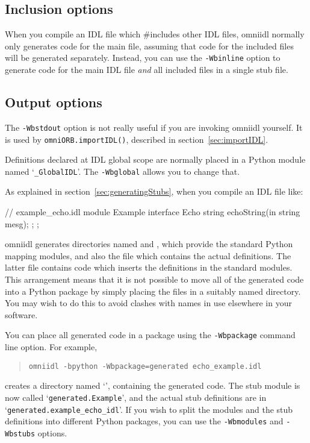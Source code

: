 \documentclass[11pt,oneside,a4paper]{book}
\newcommand{\module}[1]{\texttt{#1}}
\newcommand{\op}[1]{\texttt{#1()}}
\newcommand{\cmdline}[1]{\texttt{#1}}
\begin{document}
\subsection{Inclusion options}

When you compile an IDL file which \#includes other IDL files, omniidl
normally only generates code for the main file, assuming that code for
the included files will be generated separately. Instead, you can use
the \cmdline{-Wbinline} option to generate code for the main IDL file
\emph{and} all included files in a single stub file.


\subsection{Output options}

The \cmdline{-Wbstdout} option is not really useful if you are
invoking omniidl yourself. It is used by \op{omniORB.importIDL},
described in section~\ref{sec:importIDL}.

Definitions declared at IDL global scope are normally placed in a
Python module named `\module{\_GlobalIDL}'. The \cmdline{-Wbglobal}
allows you to change that.

As explained in section~\ref{sec:generatingStubs}, when you compile an
IDL file like:

\begin{idllisting}
// example_echo.idl
module Example {
  interface Echo {
    string echoString(in string mesg);
  };
};
\end{idllisting}

\noindent omniidl generates directories named  and
, which provide the standard Python mapping
modules, and also the file  which contains
the actual definitions. The latter file contains code which inserts
the definitions in the standard modules. This arrangement means that
it is not possible to move all of the generated code into a Python
package by simply placing the files in a suitably named directory.
You may wish to do this to avoid clashes with names in use elsewhere
in your software.

You can place all generated code in a package using the
\cmdline{-Wbpackage} command line option. For example,

\begin{quote}
\cmdline{omniidl -bpython -Wbpackage=generated echo\_example.idl}
\end{quote}

\noindent creates a directory named `', containing the
generated code. The stub module is now called
`\module{generated.Example}', and the actual stub definitions are in
`\module{generated.example\_echo\_idl}'. If you wish to split the
modules and the stub definitions into different Python packages, you
can use the \cmdline{-Wbmodules} and \cmdline{-Wbstubs} options.
\end{document}
